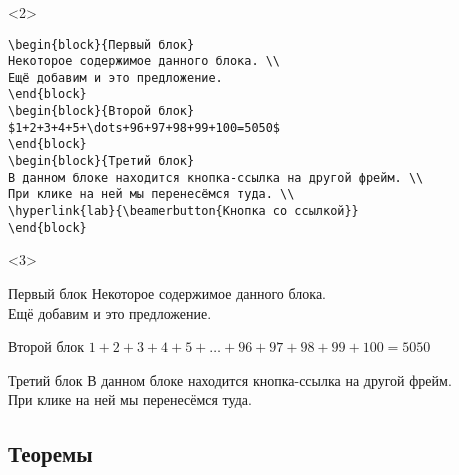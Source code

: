 \documentclass[aspectratio=169,
]{beamer}
\begin{document}
\begin{frame}[fragile, label=f14]
\frametitle{\insertsection}
\framesubtitle{\insertsubsection}
\begin{onlyenv}<2>
\begin{verbatim}
\begin{block}{Первый блок}
Некоторое содержимое данного блока. \\
Ещё добавим и это предложение.
\end{block}
\begin{block}{Второй блок}
$1+2+3+4+5+\dots+96+97+98+99+100=5050$
\end{block}
\begin{block}{Третий блок}
В данном блоке находится кнопка-ссылка на другой фрейм. \\
При клике на ней мы перенесёмся туда. \\
\hyperlink{lab}{\beamerbutton{Кнопка со ссылкой}}
\end{block}
\end{verbatim}
\end{onlyenv}

\begin{onlyenv}<3>
\begin{block}{Первый блок}%
Некоторое содержимое данного блока. \\
Ещё добавим и это предложение.
\end{block}
\begin{block}{Второй блок}
$1+2+3+4+5+\dots+96+97+98+99+100=5050$
\end{block}
\begin{block}{Третий блок}
В данном блоке находится кнопка-ссылка на другой фрейм. \\
При клике на ней мы перенесёмся туда. \\
\hyperlink{big_text}{}%
\end{block}
\end{onlyenv}
\end{frame}



\subsection{Теоремы}
\end{document}
